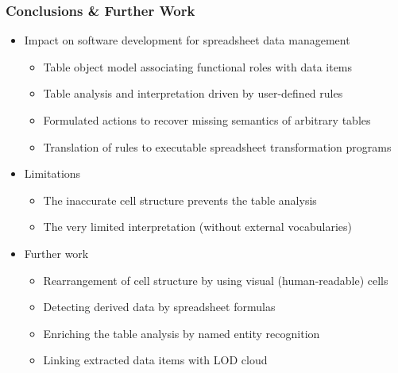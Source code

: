 \documentclass[10pt]{beamer}
\begin{document}

\begin{frame}
\frametitle{Conclusions \& Further Work}

\begin{itemize}
\item Impact on software development for spreadsheet data management
\begin{itemize}
\item Table object model associating functional roles with data items
\item Table analysis and interpretation driven by user-defined rules
\item Formulated actions to recover missing semantics of arbitrary tables
\item Translation of rules to executable spreadsheet transformation programs
\end{itemize}
\medskip
\item Limitations
\begin{itemize}
\item The inaccurate cell structure prevents the table analysis
\item The very limited interpretation (without external vocabularies)
\end{itemize}
\medskip
\item Further work
\begin{itemize}
\item Rearrangement of cell structure by using visual (human-readable) cells
\item Detecting derived data by spreadsheet formulas
\item Enriching the table analysis by named entity recognition
\item Linking extracted data items with LOD cloud
\end{itemize}
\end{itemize}

\end{frame}
\end{document}
